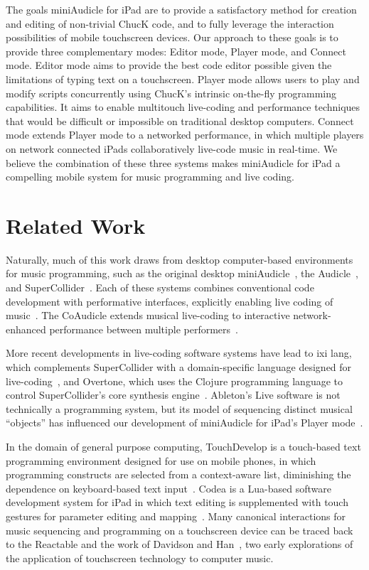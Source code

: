\documentclass{article}
\begin{document}
The goals miniAudicle for iPad are to provide a satisfactory method for creation and editing of non-trivial ChucK code, and to fully leverage the interaction possibilities of mobile touchscreen devices. 
Our approach to these goals is to provide three complementary modes: Editor mode, Player mode, and Connect mode. 
Editor mode aims to provide the best code editor possible given the limitations of typing text on a touchscreen. 
Player mode allows users to play and modify scripts concurrently using ChucK's intrinsic on-the-fly programming capabilities. 
It aims to enable multitouch live-coding and performance techniques that would be difficult or impossible on traditional desktop computers. 
Connect mode extends Player mode to a networked performance, in which multiple players on network connected iPads collaboratively live-code music in real-time. 
We believe the combination of these three systems makes miniAudicle for iPad a compelling mobile system for music programming and live coding. 

\section{Related Work}\label{sec:relatedWork}

Naturally, much of this work draws from desktop computer-based environments for music programming, such as the original desktop miniAudicle~\cite{salazar2006miniaudicle}, the Audicle~\cite{wang2004audicle}, and SuperCollider~\cite{mccartney2002supercollider}. 
Each of these systems combines conventional code development with performative interfaces, explicitly enabling live coding of music~\cite{collins2003live}. 
The CoAudicle extends musical live-coding to interactive network-enhanced performance between multiple performers~\cite{wang2005coaudicle}. 

More recent developments in live-coding software systems have lead to ixi lang, which complements SuperCollider with a domain-specific language designed for live-coding~\cite{magnusson2011ixi}, and Overtone, which uses the Clojure programming language to control SuperCollider's core synthesis engine~\cite{aaron2013overtone}. 
Ableton's Live software is not technically a programming system, but its model of sequencing distinct musical ``objects'' has influenced our development of miniAudicle for iPad's Player mode~\cite{ableton}. 

In the domain of general purpose computing, TouchDevelop is a touch-based text programming environment designed for use on mobile phones, in which programming constructs are selected from a context-aware list, diminishing the dependence on keyboard-based text input~\cite{Tillmann2011}. 
Codea is a Lua-based software development system for iPad in which text editing is supplemented with touch gestures for parameter editing and mapping~\cite{saens2014codea}. 
Many canonical interactions for music sequencing and programming on a touchscreen device can be traced back to the Reactable \cite{jorda2007reactable} and the work of Davidson and Han~\cite{davidson2006synthesis}, two early explorations of the application of touchscreen technology to computer music. 
\end{document}
